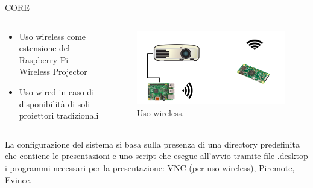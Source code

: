 \documentclass{beamer}
\begin{document}
\begin{frame}[fragile]{CORE}

\begin{columns}[T]
    \begin{column}{.37\textwidth}
    \begin{itemize}
    \item Uso wireless\newline
    \small come estensione del Raspberry Pi Wireless Projector
    \item \normalsize Uso wired\newline
    \small in caso di disponibilità di soli proiettori tradizionali\\
    \end{itemize}

    \end{column}
    \begin{column}{.61\textwidth}
    \begin{figure}
        \includegraphics[scale=1.5]{img/setup-with-pizero.png}
        \caption{Uso wireless.}
    \end{figure}
    \end{column}
\end{columns}
\vspace{1em}

 La configurazione del sistema si basa sulla presenza di una directory predefinita che contiene le presentazioni e uno script che esegue all'avvio tramite file .desktop i programmi necessari per la presentazione: VNC (per uso wireless), Piremote, Evince.
\end{frame}
\end{document}
